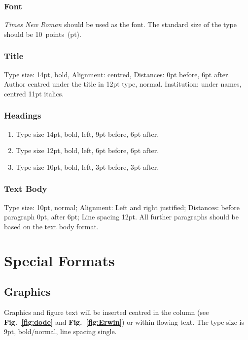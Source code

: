 \documentclass[a4paper, 10pt, twocolumn]{article}
\begin{document}
\subsubsection{Font}
\textit{Times New Roman} should be used as the font. The standard size of the type should be 10~points~(pt). 

\subsubsection{Title} 
Type size: 14pt, bold, Alignment: centred, Distances: 0pt before, 6pt after. Author centred under the title in 12pt type, normal. Institution: under names, centred 11pt italics.

\subsubsection{Headings}
\begin{enumerate}
	\item Type size 14pt, bold, left, 9pt before, 6pt after.
	\item Type size 12pt, bold, left, 6pt before, 6pt after.
 	\item Type size 10pt, bold, left, 3pt before, 3pt after.
\end{enumerate}

\subsubsection{Text Body}
Type size: 10pt, normal; Alignment: Left and right justified; Distances: before paragraph 0pt, after 6pt; Line spacing 12pt. All further paragraphs should be based on the text body format.

\section{Special Formats} \label{sec:SpecialFormats}

\subsection{Graphics}

Graphics and figure text will be inserted centred in the column (see \textbf{Fig.~\ref{fig:dode}} 
and \textbf{Fig.~\ref{fig:Erwin}}) or within flowing text. The type size is 9pt, bold/normal, line spacing single.
\end{document}

